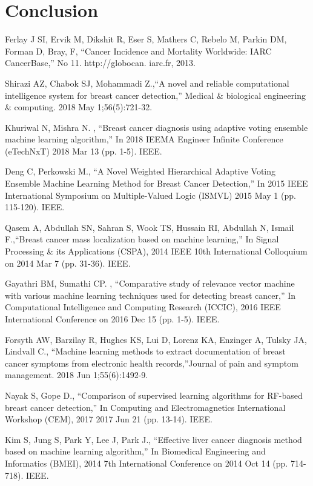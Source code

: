 \documentclass[conference]{IEEEtran}
\begin{document}
\section{Conclusion}


\begin{thebibliography}{00}
 Ferlay J SI, Ervik M, Dikshit R, Eser S, Mathers C, Rebelo M,
Parkin DM, Forman D, Bray, F, ``Cancer Incidence and
Mortality Worldwide: IARC CancerBase,'' No 11. http://globocan.
iarc.fr, 2013.

 Shirazi AZ, Chabok SJ, Mohammadi Z.,``A novel and reliable computational intelligence system for breast cancer detection,'' Medical \& biological engineering \& computing. 2018 May 1;56(5):721-32.

 Khuriwal N, Mishra N. , ``Breast cancer diagnosis using adaptive voting ensemble machine learning algorithm,'' In 2018 IEEMA Engineer Infinite Conference (eTechNxT) 2018 Mar 13 (pp. 1-5). IEEE.

 Deng C, Perkowski M., ``A Novel Weighted Hierarchical Adaptive Voting Ensemble Machine Learning Method for Breast Cancer Detection,'' In 2015 IEEE International Symposium on Multiple-Valued Logic (ISMVL) 2015 May 1 (pp. 115-120). IEEE.

 Qasem A, Abdullah SN, Sahran S, Wook TS, Hussain RI, Abdullah N, Ismail F.,``Breast cancer mass localization based on machine learning,'' In Signal Processing \& its Applications (CSPA), 2014 IEEE 10th International Colloquium on 2014 Mar 7 (pp. 31-36). IEEE.

 Gayathri BM, Sumathi CP. , ``Comparative study of relevance vector machine with various machine learning techniques used for detecting breast cancer,'' In Computational Intelligence and Computing Research (ICCIC), 2016 IEEE International Conference on 2016 Dec 15 (pp. 1-5). IEEE.
  
 Forsyth AW, Barzilay R, Hughes KS, Lui D, Lorenz KA, Enzinger A, Tulsky JA, Lindvall C., ``Machine learning methods to extract documentation of breast cancer symptoms from electronic health records,''Journal of pain and symptom management. 2018 Jun 1;55(6):1492-9.

 Nayak S, Gope D., ``Comparison of supervised learning algorithms for RF-based breast cancer detection,'' In Computing and Electromagnetics International Workshop (CEM), 2017 2017 Jun 21 (pp. 13-14). IEEE.

 Kim S, Jung S, Park Y, Lee J, Park J., ``Effective liver cancer diagnosis method based on machine learning algorithm,'' In Biomedical Engineering and Informatics (BMEI), 2014 7th International Conference on 2014 Oct 14 (pp. 714-718). IEEE.


\end{thebibliography}
\end{document}
